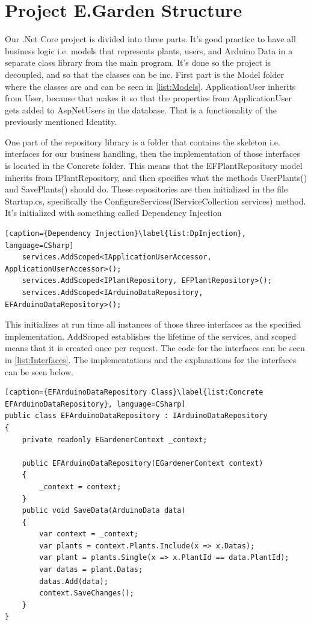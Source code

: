 \documentclass[a4paper,12pt,twoside,openright,titlepage]{book}
\begin{document}
\section{Project E.Garden Structure}
Our .Net Core project is divided into three parts. It's good practice to have all business logic i.e. models that represents plants, users, and Arduino Data in a separate class library from the main program. It's done so the project is decoupled, and so that the classes can be inc. First part is the Model folder where the classes are and can be seen in \ref{list:Models}. ApplicationUser inherits from User, because that makes it so that the properties from ApplicationUser gets added to AspNetUsers in the database. That is a functionality of the previously mentioned Identity. 

One part of the repository library is a folder that contains the skeleton i.e. interfaces for our business handling, then the implementation of those interfaces is located in the Concrete folder. This means that the EFPlantRepository model inherits from IPlantRepository, and then specifies what the methods UserPlants() and SavePlants() should do. These repositories are then initialized in the file Startup.cs, specifically the ConfigureServices(IServiceCollection services) method. It's initialized with something called Dependency Injection\cite{DependencyInjection}

\begin{lstlisting}[caption={Dependency Injection}\label{list:DpInjection}, language=CSharp]
	services.AddScoped<IApplicationUserAccessor, ApplicationUserAccessor>();
	services.AddScoped<IPlantRepository, EFPlantRepository>();
    services.AddScoped<IArduinoDataRepository, EFArduinoDataRepository>();
\end{lstlisting}

This initializes at run time all instances of those three interfaces as the specified implementation. AddScoped establishes the lifetime of the services, and scoped means that it is created once per request. The code for the interfaces can be seen in \ref{list:Interfaces}. The implementations and the explanations for the interfaces can be seen below.

\begin{lstlisting}[caption={EFArduinoDataRepository Class}\label{list:Concrete EFArduinoDataRepository}, language=CSharp]
public class EFArduinoDataRepository : IArduinoDataRepository
{
	private readonly EGardenerContext _context;
        
	public EFArduinoDataRepository(EGardenerContext context)
	{
        _context = context;
	}
	public void SaveData(ArduinoData data)
	{
		var context = _context;
		var plants = context.Plants.Include(x => x.Datas);
	    var plant = plants.Single(x => x.PlantId == data.PlantId);
        var datas = plant.Datas;
        datas.Add(data);
		context.SaveChanges();
	}
}
\end{lstlisting}
\end{document}
